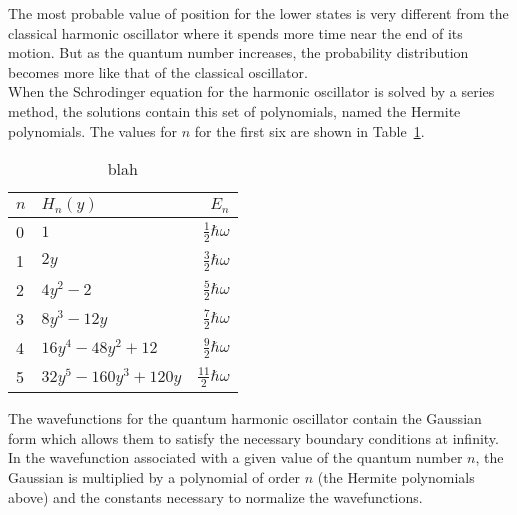 \documentclass{article}
\begin{document}
\noindent The most probable value of position for the lower states is very different from the classical harmonic oscillator where it spends more time near the end of its motion. But as the quantum number increases, the probability distribution becomes more like that of the classical oscillator.\\

\noindent When the Schrodinger equation for the harmonic oscillator is solved by a series method, the solutions contain this set of polynomials, named the Hermite polynomials. The values for $n$ for the first six are shown in Table~\ref{tab:1}.

\begin{table}[ht]
\begin{center}
\caption{\label{tab:1} blah}
\begin{tabular}{ l l r }
  \hline
  \hline
  $n$ & $H_n(y)$ & $E_n$ \\
  \hline
  0 & $1$ & $\frac{1}{2}\hbar\omega$ \\[0.5em]
  1 & $2y$ & $\frac{3}{2}\hbar\omega$ \\[0.5em]
  2 & $4y^{2}-2$ & $\frac{5}{2}\hbar\omega$ \\[0.5em]
  3 & $8y^{3}-12y$ & $\frac{7}{2}\hbar\omega$ \\[0.5em]
  4 & $16y^{4}-48y^{2}+12$ & $\frac{9}{2}\hbar\omega$ \\[0.5em]
  5 & $32y^{5}-160y^{3}+120y$ & $\frac{11}{2}\hbar\omega$ \\[0.5em]
  \hline
  \hline
\end{tabular}
\end{center}
\end{table}

\noindent The wavefunctions for the quantum harmonic oscillator contain the Gaussian form which allows them to satisfy the necessary boundary conditions at infinity. In the wavefunction associated with a given value of the quantum number $n$, the Gaussian is multiplied by a polynomial of order $n$ (the Hermite polynomials
above) and the constants necessary to normalize the wavefunctions.
\end{document}

